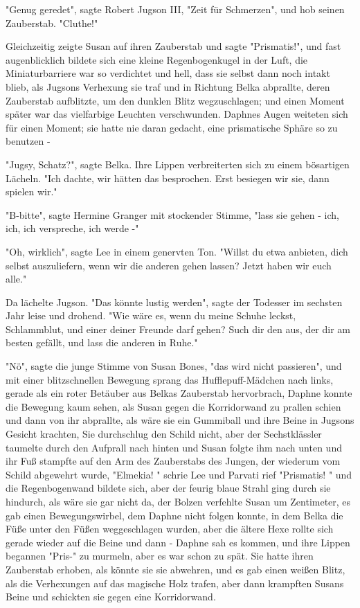 {"Genug geredet", sagte Robert Jugson III, "Zeit für Schmerzen", und hob seinen Zauberstab. "Cluthe!"

Gleichzeitig zeigte Susan auf ihren Zauberstab und sagte "Prismatis!", und fast augenblicklich bildete sich eine kleine Regenbogenkugel in der Luft, die Miniaturbarriere war so verdichtet und hell, dass sie selbst dann noch intakt blieb, als Jugsons Verhexung sie traf und in Richtung Belka abprallte, deren Zauberstab aufblitzte, um den dunklen Blitz wegzuschlagen; und einen Moment später war das vielfarbige Leuchten verschwunden. Daphnes Augen weiteten sich für einen Moment; sie hatte nie daran gedacht, eine prismatische Sphäre so zu benutzen -

"Jugsy, Schatz?", sagte Belka. Ihre Lippen verbreiterten sich zu einem bösartigen Lächeln. "Ich dachte, wir hätten das besprochen. Erst besiegen wir sie, dann spielen wir."

"B-bitte", sagte Hermine Granger mit stockender Stimme, "lass sie gehen - ich, ich, ich verspreche, ich werde -"

"Oh, wirklich", sagte Lee in einem genervten Ton. "Willst du etwa anbieten, dich selbst auszuliefern, wenn wir die anderen gehen lassen? Jetzt haben wir euch alle."

Da lächelte Jugson. "Das könnte lustig werden", sagte der Todesser im sechsten Jahr leise und drohend. "Wie wäre es, wenn du meine Schuhe leckst, Schlammblut, und einer deiner Freunde darf gehen? Such dir den aus, der dir am besten gefällt, und lass die anderen in Ruhe."

"Nö", sagte die junge Stimme von Susan Bones, "das wird nicht passieren", und mit einer blitzschnellen Bewegung sprang das Hufflepuff-Mädchen nach links, gerade als ein roter Betäuber aus Belkas Zauberstab hervorbrach, Daphne konnte die Bewegung kaum sehen, als Susan gegen die Korridorwand zu prallen schien und dann von ihr abprallte, als wäre sie ein Gummiball und ihre Beine in Jugsons Gesicht krachten, Sie durchschlug den Schild nicht, aber der Sechstklässler taumelte durch den Aufprall nach hinten und Susan folgte ihm nach unten und ihr Fuß stampfte auf den Arm des Zauberstabs des Jungen, der wiederum vom Schild abgewehrt wurde, "Elmekia! " schrie Lee und Parvati rief "Prismatis! " und die Regenbogenwand bildete sich, aber der feurig blaue Strahl ging durch sie hindurch, als wäre sie gar nicht da, der Bolzen verfehlte Susan um Zentimeter, es gab einen Bewegungswirbel, dem Daphne nicht folgen konnte, in dem Belka die Füße unter den Füßen weggeschlagen wurden, aber die ältere Hexe rollte sich gerade wieder auf die Beine und dann - Daphne sah es kommen, und ihre Lippen begannen "Pris-" zu murmeln, aber es war schon zu spät. Sie hatte ihren Zauberstab erhoben, als könnte sie sie abwehren, und es gab einen weißen Blitz, als die Verhexungen auf das magische Holz trafen, aber dann krampften Susans Beine und schickten sie gegen eine Korridorwand.

}
